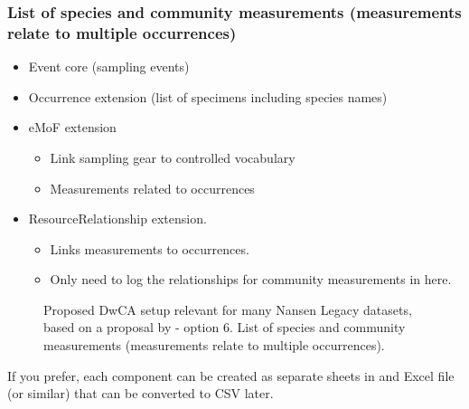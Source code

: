 \documentclass[a4paper,english, 11pt]{article}
\begin{document}
\subsubsection{List of species and community measurements (measurements relate to multiple occurrences)}
\label{ss:speciesmeasurementsmultipleoccurrence}

\begin{itemize}
\item Event core (sampling events)
\item Occurrence extension (list of specimens including species names)
\item eMoF extension
\begin{itemize}
\item Link sampling gear to controlled vocabulary
\item Measurements related to occurrences
\end{itemize}
\item ResourceRelationship extension.
\begin{itemize}
\item Links measurements to occurrences. 
\item Only need to log the relationships for community measurements in here. 
\end{itemize}
\end{itemize}  

\begin{figure}[H]
    \caption{\label{fig:dwca_aen_eg4}
        Proposed DwCA setup relevant for many Nansen Legacy datasets, based on a proposal by \cite{de2017toward} - option 6. List of species and community measurements (measurements relate to multiple occurrences).
    }
\end{figure}

If you prefer, each component can be created as separate sheets in and Excel file (or similar) that can be converted to CSV later.
\end{document}
